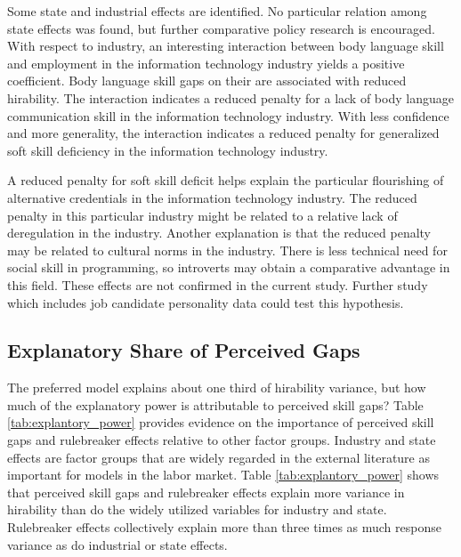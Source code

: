 \documentclass[review]{elsarticle}
\begin{document}
Some state and industrial effects are identified.
No particular relation among state effects was found, but further comparative policy research is encouraged.
With respect to industry, an interesting interaction between body language skill and employment in the information technology industry yields a positive coefficient.
Body language skill gaps on their are associated with reduced hirability.
The interaction indicates a reduced penalty for a lack of body language communication skill
in the information technology industry.
With less confidence and more generality, the interaction indicates a reduced penalty for generalized soft skill deficiency in the information technology industry.

A reduced penalty for soft skill deficit helps explain the particular flourishing of alternative credentials in the information technology industry.
The reduced penalty in this particular industry might be related to a relative lack of deregulation in the industry.
Another explanation is that the reduced penalty may be related to cultural norms in the industry.
There is less technical need for social skill in programming, so introverts may obtain a comparative advantage in this field.
These effects are not confirmed in the current study.
Further study which includes job candidate personality data could test this hypothesis.

\subsection{Explanatory Share of Perceived Gaps}

The preferred model explains about one third of hirability variance, but how much of the explanatory power is attributable to perceived skill gaps?
Table \ref{tab:explantory_power} provides evidence on the importance of perceived skill gaps and rulebreaker effects relative to other factor groups.
Industry and state effects are factor groups that are widely regarded in the external literature as important for models in the labor market.
Table \ref{tab:explantory_power} shows that perceived skill gaps and rulebreaker effects explain more variance in hirability than do the widely utilized variables for industry and state.
Rulebreaker effects collectively explain more than three times as much response variance as do industrial or state effects.
\end{document}
